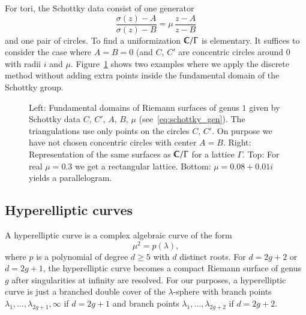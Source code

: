 \documentclass[Thesis]{subfiles}
\begin{document}
  For tori, the Schottky data
consist of one generator 
\begin{equation}
  \label{eq:schottky_gen}
  \frac{\sigma(z)-A}{\sigma(z)-B}=\mu\,\frac{z-A}{z-B}
\end{equation}
and one pair of circles. To find a uniformization $\mathbb C/\Gamma$ is
elementary. It suffices to consider the case where $A=B=0$ (and $C$,
$C'$ are concentric circles around $0$ with radii $i$ and
$\mu$. Figure~\ref{fig:schottky_g1} shows two examples where we apply
the discrete method without adding extra points inside the fundamental
domain of the Schottky group.
\begin{figure}
\centering
{}
\caption{ Left: Fundamental domains of Riemann surfaces of genus $1$
  given by Schottky data $C$, $C'$, $A$, $B$, $\mu$
  (see~\eqref{eq:schottky_gen}). The triangulations use only points on
  the circles $C$, $C'$. On purpose we have not chosen concentric
  circles with center $A=B$. Right: Representation of the same
  surfaces as $\mathbb C/\Gamma$ for a lattice $\Gamma$. Top: For real
  $\mu=0.3$ we get a rectangular lattice. Bottom: $\mu=0.08+0.01i$
  yields a parallelogram.}
\label{fig:schottky_g1}
\end{figure}

\subsection{Hyperelliptic curves}
\label{sec:hyperelliptic}

A hyperelliptic curve is a complex algebraic curve of the form 
\begin{equation}
  \label{eq:hyperelliptic_curve}
  \mu^2=p(\lambda), 
\end{equation}
where $p$ is a polynomial of degree $d\geq 5$ with $d$ distinct
roots. For $d=2g+2$ or $d=2g+1$, the hyperelliptic curve becomes a
compact Riemann surface of genus $g$ after singularities at infinity
are resolved. For our purposes, a hyperelliptic curve is just a
branched double cover of the $\lambda$-sphere with branch points
$\lambda_{1},\ldots,\lambda_{2g+1},\infty$ if $d=2g+1$ and branch
points $\lambda_{1},\ldots,\lambda_{2g+2}$ if $d=2g+2$.
\end{document}
